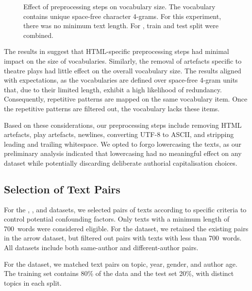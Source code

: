 \begin{figure}[htbp]
    \centering
    
    \caption[Effect of preprocessing steps on vocabulary size]{Effect of preprocessing steps on vocabulary size. The vocabulary contains unique space-free character 4-grams.
    For this experiment, there was no minimum text length.
    For \dataPan{}, train and test split were combined.}
    \label{fig:preprocesing_impact_vocab_size}
\end{figure}

The results in  suggest that HTML-specific preprocessing steps had minimal impact on the size of vocabularies.
Similarly, the removal of artefacts specific to theatre plays had little effect on the overall vocabulary size.
The results aligned with expectations, as the vocabularies are defined over space-free 4-gram units that, due to their limited length, exhibit a high likelihood of redundancy.
Consequently, repetitive patterns are mapped on the same vocabulary item.
Once the repetitive patterns are filtered out, the vocabulary lacks these items.

Based on these considerations, our preprocessing steps include removing HTML artefacts, play artefacts, newlines, converting UTF-8 to ASCII, and stripping leading and trailing whitespace.
We opted to forgo lowercasing the texts, as our preliminary analysis indicated that lowercasing had no meaningful effect on any dataset while potentially discarding deliberate authorial capitalisation choices.


\subsection{Selection of Text Pairs}
\label{subsec:dataset_text_pair_selection}

For the \dataBlog{}, \dataStudent{}, and \dataGutenberg{} datasets, we selected pairs of texts according to specific criteria to control potential confounding factors.
Only texts with a minimum length of \num{700}~words were considered eligible. 
For the \dataPan{} dataset, we retained the existing pairs in the arrow dataset, but filtered out pairs with texts with less than \num{700}~words. 
All datasets include both same-author and different-author pairs. 

For the \dataBlog{} dataset, we matched text pairs on topic, year, gender, and author age. The training set contains 80\% of the data and the test set 20\%, with distinct topics in each split.


